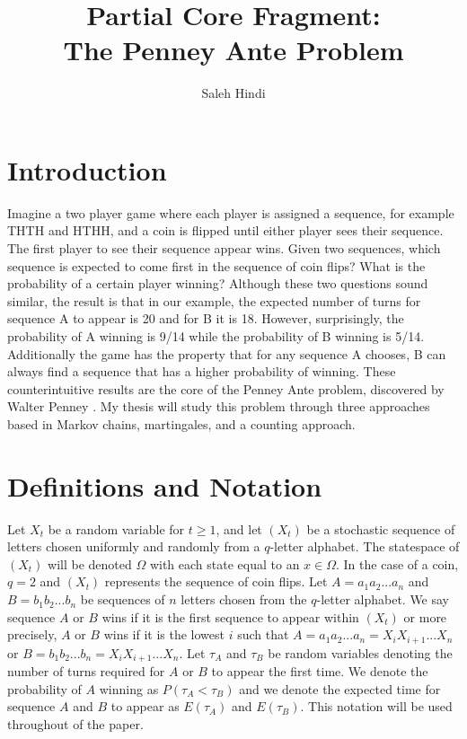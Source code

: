 \documentclass{article}
\numberwithin{mytheorem}{subsection} %
\begin{document}
	\title{Partial Core Fragment: \\ The Penney Ante Problem}
	\author{Saleh Hindi}

	\maketitle

	\section{Introduction}
		Imagine a two player game where
		each player is assigned a sequence, for example THTH and HTHH, and a coin is flipped until either player sees their sequence.
		The first player to see their sequence appear wins.
		Given two sequences, which sequence is expected to come first in the
		sequence of coin flips? What is the probability of a certain player winning? Although these two
		questions sound similar, the result is that in our example,
		the expected number of turns for sequence A to appear is 20 and for B it is 18. However, surprisingly, the probability
		of A winning is 9/14 while the probability of B winning is 5/14. Additionally the game has the property
		that for any sequence A chooses, B can always find a sequence that has a higher probability of winning.
		These counterintuitive results are the core of the Penney Ante problem, discovered by Walter Penney
		\cite{gardner}. My thesis will study this problem through three approaches based in Markov chains, martingales,
		and a counting approach.

	\section{Definitions and Notation}
		Let $X_t$ be a random variable for $t \geq 1$, and let $(X_t)$ be a stochastic sequence of letters chosen uniformly and
		randomly from a $q$-letter alphabet. The statespace of $(X_t)$ will be denoted $\Omega$ with each state equal to an $x \in \Omega$. In the case of a coin, $q=2$ and $(X_t)$ represents the sequence of coin flips. Let $A=a_1a_2...a_n$ and $B=b_1b_2...b_n$ be sequences
		of $n$ letters chosen from the $q$-letter alphabet. We say
		sequence $A$ or $B$ wins if it is the first sequence to appear within $(X_t)$ or more precisely, $A$ or $B$ wins if it is the lowest $i$ such that $A = a_1a_2...a_n = X_iX_{i+1}...X_n$ or $B = b_1b_2...b_n = X_iX_{i+1}...X_n$. Let $\tau_A$ and $\tau_B$ be random variables denoting
		the number of turns required for $A$ or $B$ to appear the first time. We denote
		the probability of $A$ winning as $P(\tau_A < \tau_B)$ and we denote the expected time for sequence
		$A$ and $B$ to appear as $E(\tau_A)$ and $E(\tau_B)$. This notation will be used throughout of the paper. 
\end{document}
